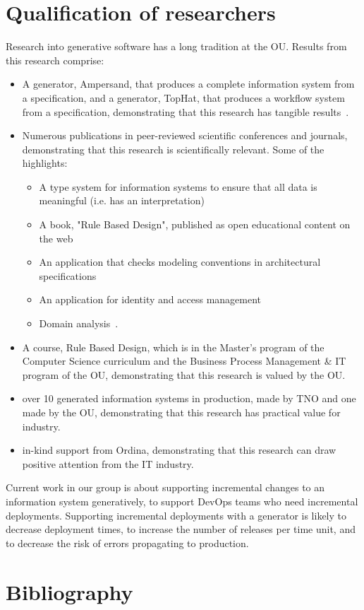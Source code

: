 \documentclass{elsarticle}
\begin{document}
\section{Qualification of researchers}
\label{sct:Qualification}
   Research into generative software has a long tradition at the OU.
   Results from this research comprise:
\begin{itemize}
   \item A generator, Ampersand, that produces a complete information system from a specification,
         and a generator, TopHat, that produces a workflow system from a specification,
         demonstrating that this research has tangible results~\cite{Michels2011}.
   \item Numerous publications in peer-reviewed scientific conferences and journals,
         demonstrating that this research is scientifically relevant.
         Some of the highlights:
         \begin{itemize}
            \item A type system for information systems to ensure that all data is meaningful (i.e. has an interpretation)~\cite{vdWoude2011}
            \item A book, "Rule Based Design", published as open educational content on the web~\cite{RBD}
            \item An application that checks modeling conventions in architectural specifications~\cite{iceis22}
            \item An application for identity and access management~\cite{SIAM2008}
            \item Domain analysis~\cite{Joosten2015}.
         \end{itemize}
   \item A course, Rule Based Design, which is in the Master's program of the Computer Science curriculum and the Business Process Management \& IT program of the OU,
         demonstrating that this research is valued by the OU.
   \item over 10 generated information systems in production, made by TNO and one made by the OU,
         demonstrating that this research has practical value for industry.
   \item in-kind support from Ordina,
         demonstrating that this research can draw positive attention from the IT industry.
\end{itemize}

Current work in our group is about supporting incremental changes to an information system generatively,
to support DevOps teams who need incremental deployments.
Supporting incremental deployments with a generator is likely to decrease deployment times,
to increase the number of releases per time unit, and to decrease the risk of errors propagating to production.
\section{Bibliography}


\end{document}
